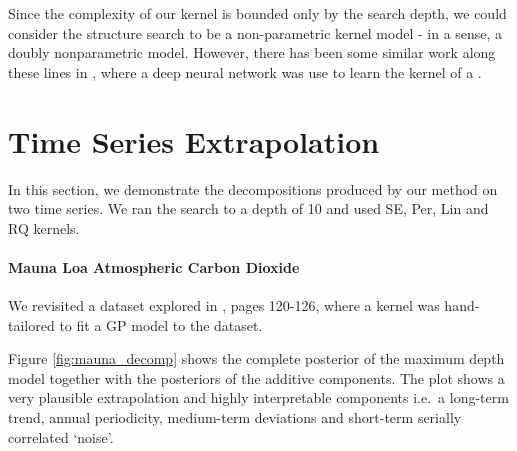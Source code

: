 \documentclass[twoside]{article}
\begin{document}
Since the complexity of our kernel is bounded only by the search depth, we could consider the structure search to be a non-parametric kernel model - in a sense, a doubly nonparametric model.  However, there has been some similar work along these lines in \cite{salakhutdinov2008using}, where a deep neural network was use to learn the kernel of a \gp{}.



\section{Time Series Extrapolation}

In this section, we demonstrate the decompositions produced by our method on two time series.
We ran the search to a depth of 10 and used SE, Per, Lin and RQ kernels.

\label{sec:extrapolation}
\paragraph{Mauna Loa Atmospheric Carbon Dioxide}

We revisited a dataset explored in \cite{rasmussen38gaussian}, pages 120-126, where a kernel was hand-tailored to fit a GP model to the dataset.


Figure \ref{fig:mauna_decomp} shows the complete posterior of the maximum depth model together with the posteriors of the additive components.
The plot shows a very plausible extrapolation and highly interpretable components i.e.~a long-term trend, annual periodicity, medium-term deviations and short-term serially correlated `noise'.
\end{document}
